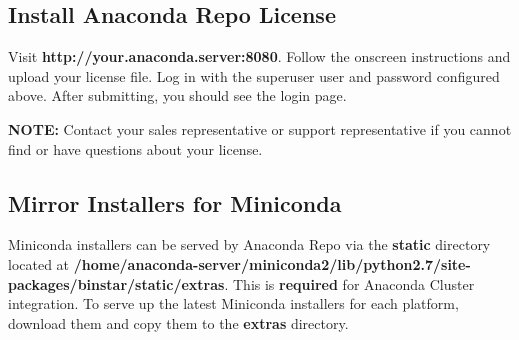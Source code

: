 \documentclass[letterpaper,10pt,openany,oneside]{sphinxmanual}
\begin{document}
\subsection{Install Anaconda Repo License}
\label{AnacondaRepository:install-anaconda-repo-license}
Visit \textbf{http://your.anaconda.server:8080}. Follow the onscreen
instructions and upload your license file. Log in with the superuser
user and password configured above. After submitting, you should see the
login page.

\textbf{NOTE:} Contact your sales representative or support representative if
you cannot find or have questions about your license.


\subsection{Mirror Installers for Miniconda}
\label{AnacondaRepository:mirror-installers-for-miniconda}
Miniconda installers can be served by Anaconda Repo via the \textbf{static}
directory located at
\textbf{/home/anaconda-server/miniconda2/lib/python2.7/site-packages/binstar/static/extras}.
This is \textbf{required} for Anaconda Cluster integration. To serve up the
latest Miniconda installers for each platform, download them and copy
them to the \textbf{extras} directory.
\end{document}
